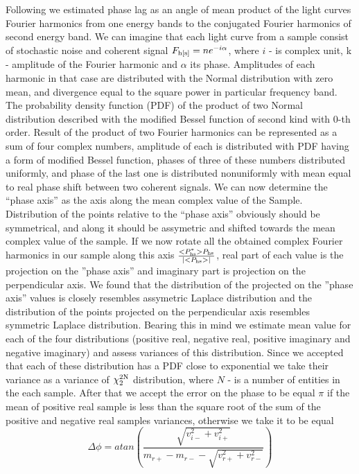 \documentclass[a4paper,fleqn,usenatbib]{mnras}
\begin{document}
Following \citep{1997ApJ...474L..43V} we estimated phase lag as an angle of mean product of the light curves Fourier harmonics from one energy bands to the conjugated Fourier harmonics of second energy band. 
We can imagine that each light curve from a sample consist of stochastic noise and coherent signal $F_{\rm h[s]} = ne^{-i\alpha}$, where $i$ - is complex unit, k - amplitude of the Fourier harmonic and $\alpha$ its phase.
Amplitudes of each harmonic in that case are distributed with the Normal distribution with zero mean, and divergence equal to the square power in particular frequency band. 
The probability density function (PDF) of the product of two Normal distribution described with the modified Bessel function of second kind with 0-th order. 
Result of the product of two Fourier harmonics can be represented as a sum of four complex numbers, amplitude of each is distributed with PDF having a form of modified Bessel function, phases of three of these numbers distributed uniformly, and phase of the last one is distributed nonuniformly with mean equal to real phase shift between two coherent signals.
We can now determine the ``phase axis'' as the axis along the mean complex value of the Sample.
Distribution of the points relative to the ``phase axis'' obviously should be symmetrical, and along it should be assymetric and shifted towards the mean complex value of the sample.
If we now rotate all the obtained complex Fourier harmonics in our sample along this axis $\frac{<P_{\rm hs}^{*}>P_{\rm hs}}{|<P_{\rm hs}>|}$, real part of each value is the projection on the ''phase axis'' and imaginary part is projection on the perpendicular axis. 
We found that the distribution of the projected on the ''phase axis'' values is closely resembles assymetric Laplace distribution and the distribution of the points projected on the perpendicular axis resembles symmetric Laplace distribution. 
Bearing this in mind we estimate mean value for each of the four distributions (positive real, negative real, positive imaginary and negative imaginary) and assess variances of this distribution.
Since we accepted that each of these distribution has a PDF close to exponential we take their variance as a variance of $\chi_2^{\rm 2N}$ distribution, where $N$ - is a number of entities in the each sample. 
After that we accept the error on the phase to be equal $\pi$ if the mean of positive real sample is less than the square root of the sum of the positive and negative real samples variances, otherwise we take it to be equal
\begin{equation}
        \Delta \phi = atan{\left(\frac{\sqrt{v_{i-}^2 + v_{i+}^{2}}}{m_{r+} - m_{r-} - \sqrt{v_{r+}^2 + v_{r-}^2}}\right)}
\end{equation}
\end{document}
